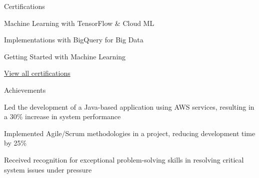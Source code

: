 \documentclass{resume} %
\begin{document}
    \begin{rSection}{Certifications}
        \begin{rSubsection}{}{}{}
                            \item Machine Learning with TensorFlow \& Cloud ML
                            \item Implementations with BigQuery for Big Data
                            \item Getting Started with Machine Learning
                    \end{rSubsection}
        \href{https://skillsoft.digitalbadges.skillsoft.com/profile/umairsaeed185770/wallet}{View all certifications}
    \end{rSection}

    \begin{rSection}{Achievements}
        \begin{rSubsection}{}{}{}
                            \item Led the development of a Java{-}based application using AWS services, resulting in a 30\% increase in system performance
                            \item Implemented Agile/Scrum methodologies in a project, reducing development time by 25\%
                            \item Received recognition for exceptional problem{-}solving skills in resolving critical system issues under pressure
                    \end{rSubsection}
    \end{rSection}
\end{document}
